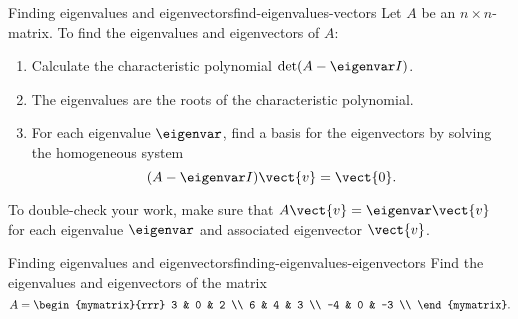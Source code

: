 \begin{procedure}{Finding eigenvalues and eigenvectors}{find-eigenvalues-vectors}
  Let $A$ be an $n\times n$-matrix. To find the eigenvalues and
  eigenvectors of $A$:
  \begin{enumerate}
  \item Calculate the characteristic polynomial $\det(A-\eigenvar I)$.
  \item The eigenvalues are the roots of the characteristic polynomial.
  \item For each eigenvalue $\eigenvar$, find a basis for the
    eigenvectors by solving the homogeneous system
    \begin{equation*}
      (A-\eigenvar I)\vect{v} = \vect{0}.
    \end{equation*}
  \end{enumerate}
  To double-check your work, make sure that $A\vect{v}=\eigenvar\vect{v}$
  for each eigenvalue $\eigenvar$ and associated eigenvector $\vect{v}$.
\end{procedure}

\begin{example}{Finding eigenvalues and eigenvectors}{finding-eigenvalues-eigenvectors}
  Find the eigenvalues and eigenvectors of the matrix
  \begin{equation*}
    A = \begin{mymatrix}{rrr}
      3  & 0 &  2 \\
      6  & 4 &  3 \\
      -4 & 0 & -3 \\
    \end{mymatrix}.
  \end{equation*}
\end{example}

